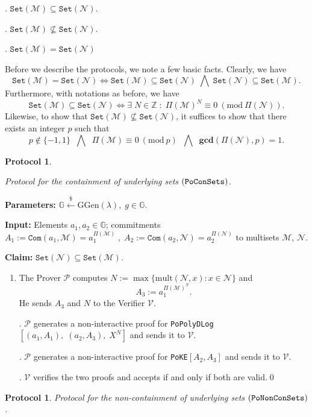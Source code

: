 \documentclass[11pt, lettersize, notitlepage, leqno, footskip=0.6cm]{article}
\newcommand{\bz}{\mathbb Z}
\newcommand{\ttt}{\texttt}
\newcommand{\sett}{\ttt{Set}}
\newcommand{\LRA}{\Longleftrightarrow}
\newcommand{\mc}{\mathcal}
\newcommand{\mb}{\mathbb}
\newcommand{\mbf}{\mathbf}
\newcommand{\mr}{\mathrm}
\newcommand{\lamb}{\lambda}
\newcommand{\sub}{\subseteq}
\newcommand{\nsub}{\nsubseteq}
\newcommand{\mP}{\mc{P}}
\newcommand{\V}{\mc{V}}
\newcommand{\vs}{\vspace{-0.15cm}}
\newcommand{\noin}{\noindent}
\newcommand{\Mod}[1]{\ (\mathrm{mod}\ #1)}
\newcommand{\GCD}{\mbf{gcd}}
\newtheorem{Prot}[Thm]{Protocol}
\numberwithin{equation}{section}
\begin{document}
{{{\noin 1. $\sett(\mc{M})\sub \sett(\mc{N})$.

\noin 2. $\sett(\mc{M})\nsub \sett(\mc{N})$.

\noin 3. $\sett(\mc{M}) = \sett(\mc{N})$ \vspace{0.1cm}

\noin Before we describe the protocols, we note a few basic facts. Clearly, we have \vs $$\sett(\mc{M}) = \sett(\mc{N})\LRA \sett(\mc{M}) \sub \sett(\mc{N})\;\bigwedge\; \sett(\mc{N}) \sub \sett(\mc{M}).$$ Furthermore, with notations as before, we have \vs $$\sett(\mc{M})\sub \sett(\mc{N})\LRA \exists\; N\in\bz\;:\;\Pi(\mc{M})^N\equiv 0\Mod{\Pi(\mc{N})}.$$ Likewise, to show that $\sett(\mc{M})\nsub \sett(\mc{N})$, it suffices to show that there exists an integer $p$ such that \vs $$p\notin \{-1,1\}   \;\;\bigwedge\;\;\Pi(\mc{M})\equiv 0\Mod{p} \;\;\bigwedge\;\; \GCD(\Pi(\mc{N}),{p})=1.$$

\begin{Prot} \hypertarget{Sets}{Protocol for the containment of underlying sets $(\tt{PoConSets})$.}\end{Prot} \vspace{-0.3cm}

\noin \textbf{Parameters:} $\mb{G}\xleftarrow{\$} \mr{GGen}(\lamb), \; g\in \mb{G}$.

\noin \textbf{Input:} Elements $a_1,a_2\in\mb{G}$; commitments $A_1 := \ttt{Com}(a_1, \mc{M}) = a_1^{\Pi(\mc{M})}\;,\;A_2 := \ttt{Com}(a_2, \mc{N})= a_2^{\Pi(\mc{N})}$ to multisets $\mc{M}$, $\mc{N}$.

\noin \textbf{Claim:} $\sett(\mc{N})\sub \sett(\mc{M})$. \vs

\begin{enumerate}[wide, labelwidth=!, labelindent=0pt] \item The Prover $\mP$ computes $N:= \max\{\mr{mult}(\mc{N}, x):x \in \mc{N}\}$ and \vs $$A_3:= a_1^{\Pi(\mc{M})^N}.$$ He sends $A_3$ and $N$ to the Verifier $\V$.

\noin 2. $\mP$ generates a non-interactive proof for \verb|PoPolyDLog|$[(a_1, A_1),\;(a_2, A_3),\;X^N]$ and sends it to $\V$.

\noin 3. $\mP$ generates a non-interactive proof for \verb|PoKE|$[A_2,A_3]$ and sends it to $\V$.

\noin 4. $\V$ verifies the two proofs and accepts if and only if both are valid.\qed \end{enumerate}



\begin{Prot} Protocol for the non-containment of underlying sets $(\tt{PoNonConSets})$.\end{Prot}\vspace{-0.3cm}

}}}
\end{document}
